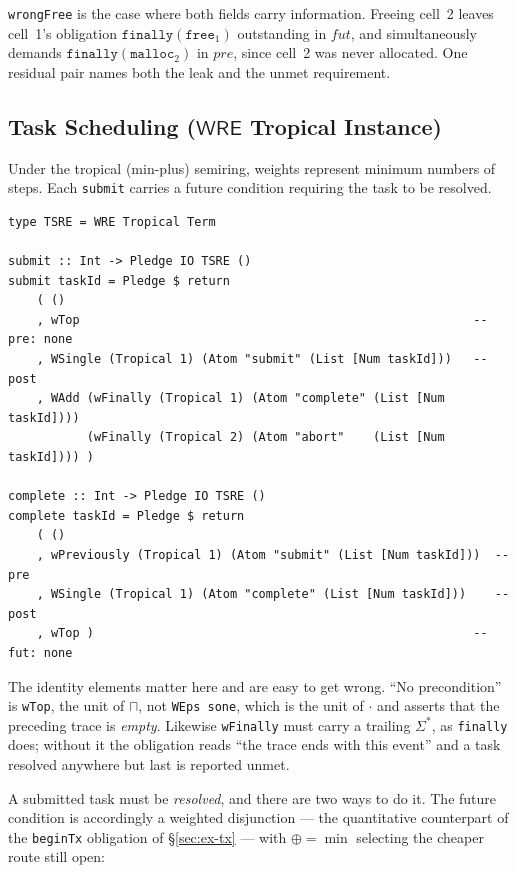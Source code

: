 \documentclass[acmsmall,screen]{acmart}
\newcommand{\WRE}{\mathsf{WRE}}
\newcommand{\pre}{\mathit{pre}}
\newcommand{\fut}{\mathit{fut}}
\newcommand{\finally}[1]{\mathtt{finally}(#1)}
\begin{document}
\lstinline{wrongFree} is the case where both fields carry information.
Freeing cell~2 leaves cell~1's obligation $\finally{\mathtt{free}_1}$
outstanding in $\fut$, and simultaneously demands
$\finally{\mathtt{malloc}_2}$ in $\pre$, since cell~2 was never allocated.
One residual pair names both the leak and the unmet requirement.

\subsection{Task Scheduling (\texorpdfstring{$\WRE$}{WRE} Tropical Instance)}
\label{sec:ex-sched}

Under the tropical (min-plus) semiring, weights represent minimum numbers of
steps.
Each \lstinline{submit} carries a future condition requiring the task to be
resolved.

\begin{lstlisting}
type TSRE = WRE Tropical Term

submit :: Int -> Pledge IO TSRE ()
submit taskId = Pledge $ return
    ( ()
    , wTop                                                       -- pre: none
    , WSingle (Tropical 1) (Atom "submit" (List [Num taskId]))   -- post
    , WAdd (wFinally (Tropical 1) (Atom "complete" (List [Num taskId])))
           (wFinally (Tropical 2) (Atom "abort"    (List [Num taskId]))) )

complete :: Int -> Pledge IO TSRE ()
complete taskId = Pledge $ return
    ( ()
    , wPreviously (Tropical 1) (Atom "submit" (List [Num taskId]))  -- pre
    , WSingle (Tropical 1) (Atom "complete" (List [Num taskId]))    -- post
    , wTop )                                                     -- fut: none
\end{lstlisting}

\noindent
The identity elements matter here and are easy to get wrong.
``No precondition'' is \lstinline{wTop}, the unit of $\sqcap$, not
\lstinline{WEps sone}, which is the unit of $\cdot$ and asserts that the
preceding trace is \emph{empty}.
Likewise \lstinline{wFinally} must carry a trailing $\Sigma^*$, as
\lstinline{finally} does; without it the obligation reads ``the trace ends
with this event'' and a task resolved anywhere but last is reported unmet.

\noindent
A submitted task must be \emph{resolved}, and there are two ways to do it.
The future condition is accordingly a weighted disjunction --- the
quantitative counterpart of the \lstinline{beginTx} obligation of
\S\ref{sec:ex-tx} --- with $\oplus = \min$ selecting the cheaper route still
open:
\end{document}
